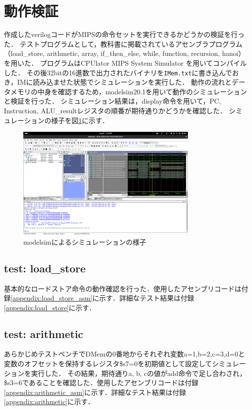 \documentclass[dvipdfmx]{jsarticle}
\begin{document}
\section{動作検証}
作成したverilogコードがMIPSの命令セットを実行できるかどうかの検証を行った．
テストプログラムとして，教科書\cite{textbook}に掲載されているアセンブラプログラム（load\_store, arithmetic, array, if\_then\_else, while, function, recursion, hanoi）を用いた．
プログラムはCPUlator MIPS System Simulator \cite{mips-sim}を用いてコンパイルした．
その後32bitの16進数で出力されたバイナリを\texttt{IMem.txt}に書き込んでおき，IMに読み込ませた状態でシミュレーションを実行した．
動作の流れとデータメモリの中身を確認するため，modelsim20.1を用いて動作のシミュレーションと検証を行った．
シミュレーション結果は，display命令を用いて，PC, Instruction, ALU\_resultレジスタの順番が期待通りかどうかを確認した．
シミュレーションの様子を図\ref{fig:simulation}に示す．
\begin{figure}[h]
\centering
  \includegraphics[width=0.8\textwidth]{modelsim.png}
  \caption{modelsimによるシミュレーションの様子}
  \label{fig:simulation}
\end{figure}

\subsection{test: load\_store}
基本的なロードストア命令の動作確認を行った．使用したアセンブリコードは付録\ref{appendix:load_store_asm}に示す．詳細なテスト結果は付録\ref{appendix:load_store}に示す．

\subsection{test: arithmetic}
あらかじめテストベンチでDMemの0番地からそれぞれ変数a=1,b=2,c=3,d=0と変数のオフセットを保持するレジスタ\$s7=0を初期値として設定してシミュレーションを実行した．
その結果，期待通りa, b, cの値がadd命令で足し合わされ，\$s3=6であることを確認した．使用したアセンブリコードは付録\ref{appendix:arithmetic_asm}に示す．詳細なテスト結果は付録\ref{appendix:arithmetic}に示す．
\end{document}
